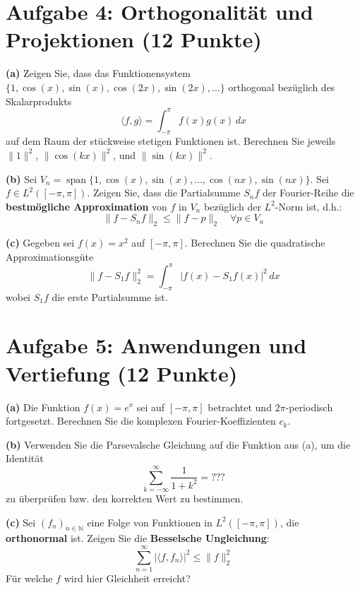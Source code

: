 \newpage

\section*{Aufgabe 4: Orthogonalität und Projektionen (12 Punkte)}
\textbf{(a)} Zeigen Sie, dass das Funktionensystem $\{1, \cos(x), \sin(x), \cos(2x), \sin(2x), \ldots\}$ orthogonal bezüglich des Skalarprodukts
\[
    \langle f, g \rangle = \int_{-\pi}^{\pi} f(x)g(x) \, dx
\]
auf dem Raum der stückweise stetigen Funktionen ist. Berechnen Sie jeweils $\|1\|^2$, $\|\cos(kx)\|^2$, und $\|\sin(kx)\|^2$.

\vspace{0.2cm}

\textbf{(b)} Sei $V_n = \operatorname{span}\{1, \cos(x), \sin(x), \ldots, \cos(nx), \sin(nx)\}$. Sei $f \in L^2([-\pi, \pi])$. Zeigen Sie, dass die Partialsumme $S_n f$ der Fourier-Reihe die \textbf{bestmögliche Approximation} von $f$ in $V_n$ bezüglich der $L^2$-Norm ist, d.h.:
\[
    \|f - S_n f\|_2 \leq \|f - p\|_2 \quad \forall p \in V_n
\]

\vspace{0.2cm}

\textbf{(c)} Gegeben sei $f(x) = x^2$ auf $[-\pi, \pi]$. Berechnen Sie die quadratische Approximationsgüte
\[
    \|f - S_1 f\|_2^2 = \int_{-\pi}^{\pi} |f(x) - S_1 f(x)|^2 \, dx
\]
wobei $S_1 f$ die erste Partialsumme ist.

\vspace{0.2cm}

\newpage

\section*{Aufgabe 5: Anwendungen und Vertiefung (12 Punkte)}
\textbf{(a)} Die Funktion $f(x) = e^x$ sei auf $[-\pi, \pi]$ betrachtet und $2\pi$-periodisch fortgesetzt. Berechnen Sie die komplexen Fourier-Koeffizienten $c_k$.

\vspace{0.2cm}

\textbf{(b)} Verwenden Sie die Parsevalsche Gleichung auf die Funktion aus (a), um die Identität
\[
    \sum_{k=-\infty}^{\infty} \frac{1}{1+k^2} = \text{???}
\]
zu überprüfen bzw. den korrekten Wert zu bestimmen.

\vspace{0.2cm}

\textbf{(c)} Sei $(f_n)_{n \in \mathbb{N}}$ eine Folge von Funktionen in $L^2([-\pi, \pi])$, die \textbf{orthonormal} ist. Zeigen Sie die \textbf{Besselsche Ungleichung}:
\[
    \sum_{n=1}^{\infty} |\langle f, f_n \rangle|^2 \leq \|f\|_2^2
\]
Für welche $f$ wird hier Gleichheit erreicht?